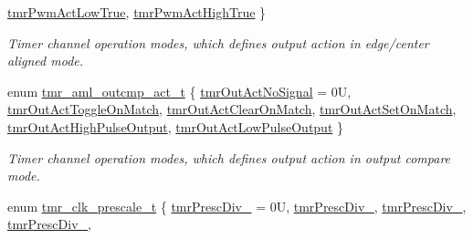 \begin{DoxyCompactItemize}
\mbox{\hyperlink{group__enum__group_gga6ce2dec1c04ab59872ebaf44bd4f4682ac425e1b4da4df82f68817fcf0d54c99f}{tmr\+Pwm\+Act\+Low\+True}}, 
\mbox{\hyperlink{group__enum__group_gga6ce2dec1c04ab59872ebaf44bd4f4682a1e501bfa74529c8aff6a4ed6b2f776b9}{tmr\+Pwm\+Act\+High\+True}}
 \}
\begin{DoxyCompactList}\small\item\em Timer channel operation modes, which defines output action in edge/center aligned mode. \end{DoxyCompactList}\item 
enum \mbox{\hyperlink{group__enum__group_ga50dbf45b245f7b30d865189716b25db5}{tmr\+\_\+aml\+\_\+outcmp\+\_\+act\+\_\+t}} \{ \newline
\mbox{\hyperlink{group__enum__group_gga50dbf45b245f7b30d865189716b25db5aaad1b16e240f58c96965f0232424b7f7}{tmr\+Out\+Act\+No\+Signal}} = 0U, 
\mbox{\hyperlink{group__enum__group_gga50dbf45b245f7b30d865189716b25db5ae4bc308696c2de2854df3e4380a5a65e}{tmr\+Out\+Act\+Toggle\+On\+Match}}, 
\mbox{\hyperlink{group__enum__group_gga50dbf45b245f7b30d865189716b25db5a700ceb754c248f0431728cc67ac90f98}{tmr\+Out\+Act\+Clear\+On\+Match}}, 
\mbox{\hyperlink{group__enum__group_gga50dbf45b245f7b30d865189716b25db5a5cb8b356632f5ba0ea011ac829e2c6a6}{tmr\+Out\+Act\+Set\+On\+Match}}, 
\newline
\mbox{\hyperlink{group__enum__group_gga50dbf45b245f7b30d865189716b25db5adfca46535f9fb0d1068dd19cd5c86674}{tmr\+Out\+Act\+High\+Pulse\+Output}}, 
\mbox{\hyperlink{group__enum__group_gga50dbf45b245f7b30d865189716b25db5a414ef18f2393379ce83d339e513e174e}{tmr\+Out\+Act\+Low\+Pulse\+Output}}
 \}
\begin{DoxyCompactList}\small\item\em Timer channel operation modes, which defines output action in output compare mode. \end{DoxyCompactList}\item 
enum \mbox{\hyperlink{group__enum__group_ga89574487805ce2171aa6f0168a3359a0}{tmr\+\_\+clk\+\_\+prescale\+\_\+t}} \{ \newline
\mbox{\hyperlink{group__enum__group_gga89574487805ce2171aa6f0168a3359a0a72a5cdd91291d6b6cfa9fe634b109d63}{tmr\+Presc\+Div\+\_}} = 0U, 
\mbox{\hyperlink{group__enum__group_gga89574487805ce2171aa6f0168a3359a0a35bd8ddbba1fea330ec5ec25419464b3}{tmr\+Presc\+Div\+\_}}, 
\mbox{\hyperlink{group__enum__group_gga89574487805ce2171aa6f0168a3359a0ad2ee9e5f5a0b29381f3a5bae60235243}{tmr\+Presc\+Div\+\_}}, 
\mbox{\hyperlink{group__enum__group_gga89574487805ce2171aa6f0168a3359a0a733478c2e8bab69b2f181d86055d8348}{tmr\+Presc\+Div\+\_}}, 

\end{DoxyCompactItemize}
